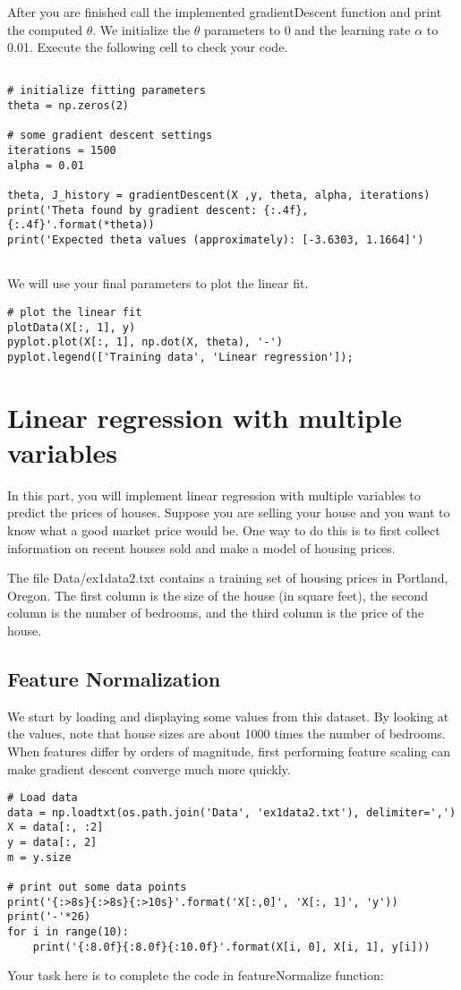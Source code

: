 \documentclass[11pt]{article}
\begin{document}
After you are finished call the implemented gradientDescent function and print the computed \(\theta\). We initialize the \(\theta\) parameters to 0 and the learning rate \(\alpha\) to 0.01. Execute the following cell to check your code.
\begin{verbatim}

# initialize fitting parameters
theta = np.zeros(2)

# some gradient descent settings
iterations = 1500
alpha = 0.01

theta, J_history = gradientDescent(X ,y, theta, alpha, iterations)
print('Theta found by gradient descent: {:.4f}, {:.4f}'.format(*theta))
print('Expected theta values (approximately): [-3.6303, 1.1664]')


\end{verbatim}
We will use your final parameters to plot the linear fit.
\begin{verbatim}
# plot the linear fit
plotData(X[:, 1], y)
pyplot.plot(X[:, 1], np.dot(X, theta), '-')
pyplot.legend(['Training data', 'Linear regression']);
\end{verbatim}
\section{Linear regression with multiple variables}
\label{sec:org462d5a5}
In this part, you will implement linear regression with multiple variables to predict the prices of houses. Suppose you are selling your house and you want to know what a good market price would be. One way to do this is to first collect information on recent houses sold and make a model of housing prices.

The file Data/ex1data2.txt contains a training set of housing prices in Portland, Oregon. The first column is the size of the house (in square feet), the second column is the number of bedrooms, and the third column is the price of the house.


\subsection{Feature Normalization}
\label{sec:org8fe983a}
We start by loading and displaying some values from this dataset. By looking at the values, note that house sizes are about 1000 times the number of bedrooms. When features differ by orders of magnitude, first performing feature scaling can make gradient descent converge much more quickly.

\begin{verbatim}
# Load data
data = np.loadtxt(os.path.join('Data', 'ex1data2.txt'), delimiter=',')
X = data[:, :2]
y = data[:, 2]
m = y.size

# print out some data points
print('{:>8s}{:>8s}{:>10s}'.format('X[:,0]', 'X[:, 1]', 'y'))
print('-'*26)
for i in range(10):
    print('{:8.0f}{:8.0f}{:10.0f}'.format(X[i, 0], X[i, 1], y[i]))
\end{verbatim}
Your task here is to complete the code in featureNormalize function:
\end{document}

